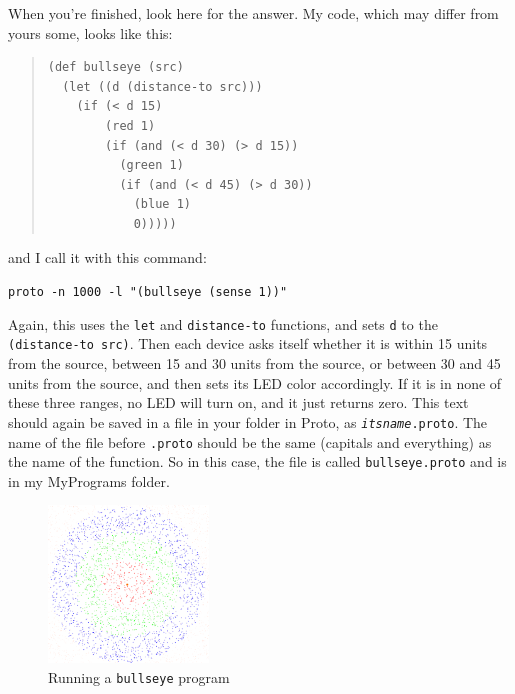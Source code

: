 \documentclass{article}
\newcommand\code[1]{\begin{center}\var{#1}\end{center}}
\newcommand\var[1]{{\tt #1}}
\begin{document}
When you're finished, look here for the answer. My code, which may
differ from yours some, looks like this:

\begin{quote}
\begin{verbatim}
(def bullseye (src)
  (let ((d (distance-to src)))
    (if (< d 15)
        (red 1)
        (if (and (< d 30) (> d 15))
          (green 1)
          (if (and (< d 45) (> d 30))
            (blue 1)
            0)))))
\end{verbatim}
\end{quote}

and I call it with this command:

\code{proto -n 1000 -l "(bullseye (sense 1))"}

Again, this uses the \var{let} and \var{distance-to} functions, and
sets \var{d} to the \var{(distance-to src)}.  Then each device asks
itself whether it is within 15 units from the source, between 15 and
30 units from the source, or between 30 and 45 units from the source,
and then sets its LED color accordingly.  If it is in none of these
three ranges, no LED will turn on, and it just returns zero.  This
text should again be saved in a file in your folder in Proto, as
\var{{\em itsname}.proto}.  The name of the file before \var{.proto}
should be the same (capitals and everything) as the name of the
function.  So in this case, the file is called \var{bullseye.proto}
and is in my MyPrograms folder.

\begin{figure}
  \vspace{-0.8cm}
  \includegraphics[width=0.38\textwidth]{figures/bullseye.png}
  \caption{Running a \var{bullseye} program}
  \vspace{-0.5cm}
  \label{f:bullseye}
\end{figure}
\end{document}

